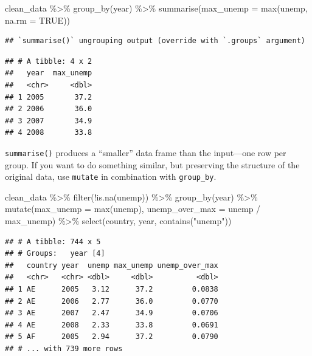 \documentclass[
  12pt,
  oneside,openany]{book}
\newenvironment{Shaded}{\begin{snugshade}}{\end{snugshade}}
\newcommand{\AttributeTok}[1]{\textcolor[rgb]{0.77,0.63,0.00}{#1}}
\newcommand{\ConstantTok}[1]{\textcolor[rgb]{0.00,0.00,0.00}{#1}}
\newcommand{\FunctionTok}[1]{\textcolor[rgb]{0.00,0.00,0.00}{#1}}
\newcommand{\NormalTok}[1]{#1}
\newcommand{\SpecialCharTok}[1]{\textcolor[rgb]{0.00,0.00,0.00}{#1}}
\newcommand{\StringTok}[1]{\textcolor[rgb]{0.31,0.60,0.02}{#1}}
\begin{document}
\begin{Shaded}
\begin{Highlighting}[]
\NormalTok{clean\_data }\SpecialCharTok{\%\textgreater{}\%}
  \FunctionTok{group\_by}\NormalTok{(year) }\SpecialCharTok{\%\textgreater{}\%}
  \FunctionTok{summarise}\NormalTok{(}\AttributeTok{max\_unemp =} \FunctionTok{max}\NormalTok{(unemp, }\AttributeTok{na.rm =} \ConstantTok{TRUE}\NormalTok{))}
\end{Highlighting}
\end{Shaded}

\begin{verbatim}
## `summarise()` ungrouping output (override with `.groups` argument)
\end{verbatim}

\begin{verbatim}
## # A tibble: 4 x 2
##   year  max_unemp
##   <chr>     <dbl>
## 1 2005       37.2
## 2 2006       36.0
## 3 2007       34.9
## 4 2008       33.8
\end{verbatim}

\texttt{summarise()} produces a ``smaller'' data frame than the input---one row per group. If you want to do something similar, but preserving the structure of the original data, use \texttt{mutate} in combination with \texttt{group\_by}.

\begin{Shaded}
\begin{Highlighting}[]
\NormalTok{clean\_data }\SpecialCharTok{\%\textgreater{}\%}
  \FunctionTok{filter}\NormalTok{(}\SpecialCharTok{!}\FunctionTok{is.na}\NormalTok{(unemp)) }\SpecialCharTok{\%\textgreater{}\%}
  \FunctionTok{group\_by}\NormalTok{(year) }\SpecialCharTok{\%\textgreater{}\%}
  \FunctionTok{mutate}\NormalTok{(}\AttributeTok{max\_unemp =} \FunctionTok{max}\NormalTok{(unemp),}
         \AttributeTok{unemp\_over\_max =}\NormalTok{ unemp }\SpecialCharTok{/}\NormalTok{ max\_unemp) }\SpecialCharTok{\%\textgreater{}\%}
  \FunctionTok{select}\NormalTok{(country, year, }\FunctionTok{contains}\NormalTok{(}\StringTok{"unemp"}\NormalTok{))}
\end{Highlighting}
\end{Shaded}

\begin{verbatim}
## # A tibble: 744 x 5
## # Groups:   year [4]
##   country year  unemp max_unemp unemp_over_max
##   <chr>   <chr> <dbl>     <dbl>          <dbl>
## 1 AE      2005   3.12      37.2         0.0838
## 2 AE      2006   2.77      36.0         0.0770
## 3 AE      2007   2.47      34.9         0.0706
## 4 AE      2008   2.33      33.8         0.0691
## 5 AF      2005   2.94      37.2         0.0790
## # ... with 739 more rows
\end{verbatim}
\end{document}
